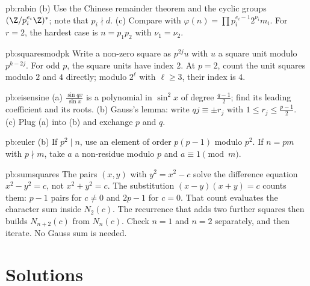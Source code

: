 \begin{hint}{pb:rabin}
(b) Use the Chinese remainder theorem and the cyclic groups $(\Z/p_i^{e_i}\Z)^*$; note that $p_i\nmid d$. (c) Compare with
$\varphi(n)=\prod p_i^{e_i-1}2^{\nu_i}m_i$. For $r=2$, the hardest case is $n=p_1p_2$ with $\nu_1=\nu_2$.
\end{hint}



\begin{hint}{pb:squaresmodpk}
Write a non-zero square as $p^{2j}u$ with $u$ a square unit modulo $p^{k-2j}$. For odd $p$, the square units have index $2$. At $p=2$, count the unit squares modulo $2$ and $4$ directly; modulo $2^\ell$ with $\ell\ge3$, their index is $4$.
\end{hint}

\begin{hint}{pb:eisensine}
(a) $\frac{\sin qx}{\sin x}$ is a polynomial in $\sin^2x$ of degree $\frac{q-1}2$; find its leading coefficient and its
roots. (b) Gauss's lemma: write $qj\equiv\pm r_j$ with $1\le r_j\le\frac{p-1}2$. (c) Plug (a) into (b) and exchange $p$
and $q$.
\end{hint}

\begin{hint}{pb:euler}
(b) If $p^2\mid n$, use an element of order $p(p-1)$ modulo $p^2$. If $n=pm$ with $p\nmid m$, take $a$ a non-residue modulo $p$
and $a\equiv1\pmod m$.
\end{hint}

\begin{hint}{pb:sumsquares}
The pairs $(x,y)$ with $y^2=x^2-c$ solve the difference equation $x^2-y^2=c$, not $x^2+y^2=c$. The substitution $(x-y)(x+y)=c$ counts them: $p-1$ pairs for $c\ne0$ and $2p-1$ for $c=0$. That count evaluates the character sum inside $N_2(c)$. The recurrence that adds two further squares then builds $N_{n+2}(c)$ from $N_n(c)$. Check $n=1$ and $n=2$ separately, and then iterate. No Gauss sum is needed.
\end{hint}

\section{Solutions}

